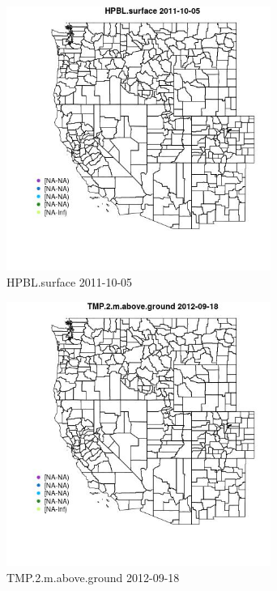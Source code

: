 \begin{figure} 
\centering  
\includegraphics[width=0.77\textwidth]{Code_Outputs/ML_input_report_ML_input_PM25_Step5_part_d_de_duplicated_aves_ML_input_MapObsHPBLsurface2011-10-05.jpg} 
\caption{\label{fig:ML_input_report_ML_input_PM25_Step5_part_d_de_duplicated_aves_ML_inputMapObsHPBLsurface2011-10-05}HPBL.surface 2011-10-05} 
\end{figure} 
 

\begin{figure} 
\centering  
\includegraphics[width=0.77\textwidth]{Code_Outputs/ML_input_report_ML_input_PM25_Step5_part_d_de_duplicated_aves_ML_input_MapObsTMP2maboveground2012-09-18.jpg} 
\caption{\label{fig:ML_input_report_ML_input_PM25_Step5_part_d_de_duplicated_aves_ML_inputMapObsTMP2maboveground2012-09-18}TMP.2.m.above.ground 2012-09-18} 
\end{figure} 
 

